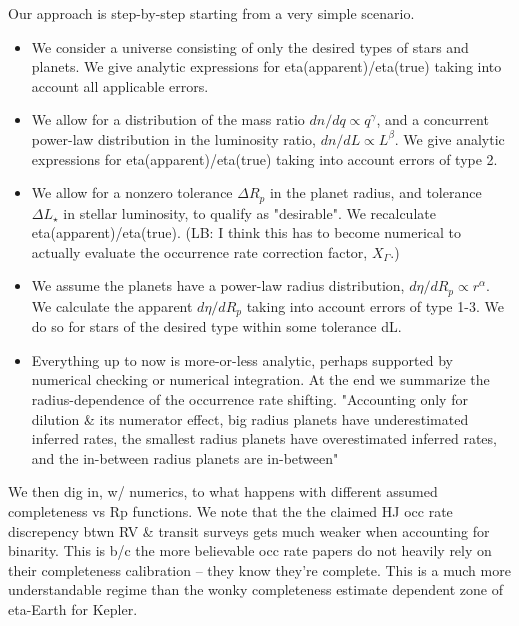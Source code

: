 \documentclass{emulateapj}
\begin{document}
Our approach is step-by-step starting from a very simple scenario.
\begin{itemize}
\item We consider a universe consisting of only the desired types of stars and
planets.  We give analytic expressions for eta(apparent)/eta(true) taking
into account all applicable errors.
%
\item We allow for a distribution of the mass ratio $dn/dq \propto q^\gamma$, 
and a concurrent power-law distribution in the luminosity ratio, $dn/dL 
\propto L^\beta$. 
We give analytic expressions for eta(apparent)/eta(true) taking into 
account errors of type 2.
%
\item We allow for a nonzero tolerance $\Delta R_p$ in the planet radius, and 
tolerance $\Delta L_\star$ in stellar luminosity, to qualify as "desirable".  
We recalculate eta(apparent)/eta(true).
(LB: I think this has to become numerical to actually evaluate the occurrence
rate correction factor, $X_\Gamma$.)
%
\item We assume the planets have a power-law radius distribution, $d\eta/dR_p
\propto r^\alpha$.  We calculate the apparent $d\eta/dR_p$ taking into account 
errors of type 1-3.  We do so for stars of the desired type within some 
tolerance dL.
%
\item Everything up to now is more-or-less analytic, perhaps supported by 
numerical checking or numerical integration. At the end we summarize the 
radius-dependence of the occurrence rate shifting.
"Accounting only for dilution \& its numerator effect, big radius planets have
underestimated inferred rates, the smallest radius planets have overestimated
inferred rates, and the in-between radius planets are in-between"

\end{itemize}

We then dig in, w/ numerics, to what happens with different assumed
completeness vs Rp functions.
We note that the the claimed HJ occ rate discrepency btwn RV \&
transit surveys gets much weaker when accounting for binarity.
This is b/c the more believable occ rate papers do not heavily rely on their
completeness calibration -- they know they're complete.
This is a much more understandable regime than the wonky completeness estimate 
dependent zone of eta-Earth for Kepler.
\end{document}
